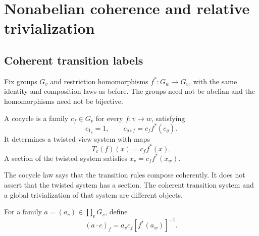 \section{Nonabelian coherence and relative trivialization}\label{sec:gauge}
\subsection{Coherent transition labels}
Fix groups \(G_v\) and restriction homomorphisms \(f^*:G_w\to G_v\), with the same identity and composition laws as before. The groups need not be abelian and the homomorphisms need not be bijective.

\begin{definition}[Cocycle]
A cocycle is a family \(c_f\in G_v\) for every \(f:v\to w\), satisfying
\[
 c_{1_v}=1,\qquad c_{g\circ f}=c_f f^*(c_g).
\]
It determines a twisted view system with maps
\[
 T_c(f)(x)=c_f f^*(x).
\]
A section of the twisted system satisfies \(x_v=c_f f^*(x_w)\).
\end{definition}
The cocycle law says that the transition rules compose coherently. It does not assert that the twisted system has a section. The coherent transition system and a global trivialization of that system are different objects.

For a family \(a=(a_v)\in\prod_vG_v\), define
\begin{equation}\label{eq:gauge}
 (a\cdot c)_f=a_vc_f[f^*(a_w)]^{-1}.
\end{equation}

